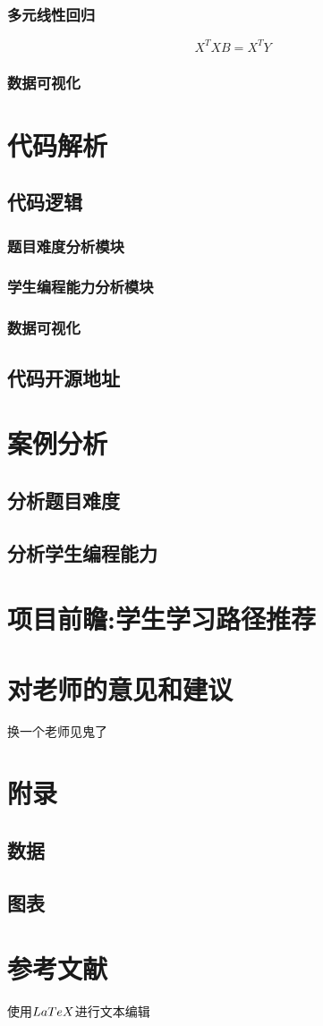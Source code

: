 \documentclass[a4paper]{ctexart}
\begin{document}
\subsubsection{多元线性回归}
$$X^TXB=X^TY$$
\subsubsection{数据可视化}
\section{代码解析}
\subsection{代码逻辑}
\subsubsection{题目难度分析模块}
\subsubsection{学生编程能力分析模块}
\subsubsection{数据可视化}
\subsection{代码开源地址}
\section{案例分析}
\subsection{分析题目难度}
\subsection{分析学生编程能力}
\section{项目前瞻:学生学习路径推荐}
\section{对老师的意见和建议}
换一个老师见鬼了
\section{附录}
\subsection{数据}
\subsection{图表}
\section{参考文献}

使用$\\LaTeX$进行文本编辑
\end{document}
